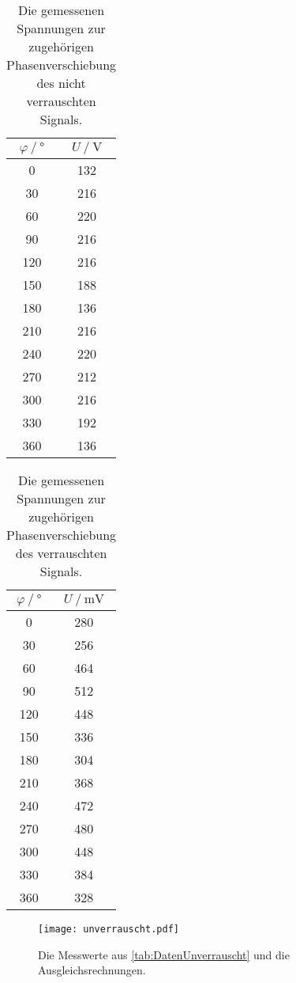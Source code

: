 \begin{table}
  \centering
  \caption{Die gemessenen Spannungen zur zugehörigen Phasenverschiebung des nicht verrauschten Signals.}
  \begin{tabular}{cc}
    \toprule
    {$\varphi \mathbin{/} °$} &
    {$U \mathbin{/} \unit{\volt}$} \\
    \midrule
      0 & 132\\
      30 & 216\\
      60 & 220\\
      90 & 216\\
      120 & 216\\
      150 & 188\\
      180 & 136\\
      210 & 216\\
      240 & 220\\
      270 & 212\\
      300 & 216\\
      330 & 192\\
      360 & 136\\
    \bottomrule
  \end{tabular}
  \label{tab:DatenUnverrauscht}
\end{table}
\begin{table}[H]
  \centering
  \caption{Die gemessenen Spannungen zur zugehörigen Phasenverschiebung des verrauschten Signals.}
  \begin{tabular}{cc}
    \toprule
    {$\varphi \mathbin{/} °$} &
    {$U \mathbin{/} \unit{\milli\volt}$} \\
    \midrule
      0 & 280\\
      30 & 256\\
      60 & 464\\
      90 & 512\\
      120 & 448\\
      150 & 336\\
      180 & 304\\
      210 & 368\\
      240 & 472\\
      270 & 480\\
      300 & 448\\
      330 & 384\\
      360 & 328\\
    \bottomrule
  \end{tabular}
  \label{tab:DatenVerrauscht}
\end{table}
\begin{figure}[H]
  \centering
  \texttt{[image: unverrauscht.pdf]}
  \caption{Die Messwerte aus \autoref{tab:DatenUnverrauscht} und die Ausgleichsrechnungen.}
  \label{fig:unverrauscht}
\end{figure}
